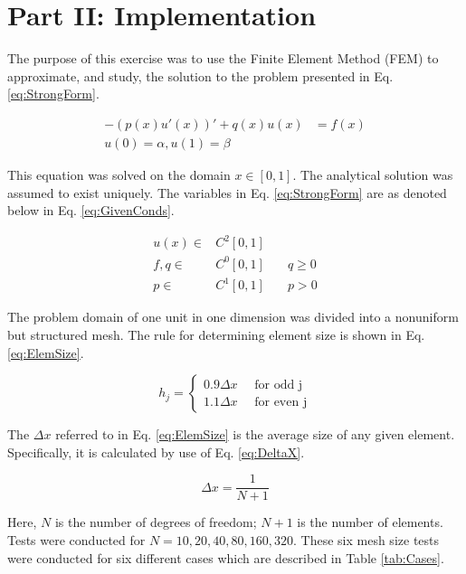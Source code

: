 \documentclass[a4paper, 12pt]{article}
\title{}
\begin{document}

\section*{Part II: Implementation} \label{sec:intro}
The purpose of this exercise was to use the Finite Element Method (FEM) 
to approximate, and study, the solution to the problem presented in 
Eq. \ref{eq:StrongForm}.

\begin{align}
-(p(x)u'(x))' + q(x) u(x) &= f(x)  \label{eq:StrongForm} \\
u(0) = \alpha , u(1) = \beta  &
\end{align}

\noindent
This equation was solved on the domain $x\in[0,1]$. 
The analytical solution was assumed to exist uniquely.
The variables in Eq. \ref{eq:StrongForm} are as denoted below in Eq. \ref{eq:GivenConds}.

\begin{align} \label{eq:GivenConds}
u(x)\in & C^2 [0,1]  & \\
f,q \in & C^0 [0,1] \quad & q \geq 0\\
p   \in & C^1 [0,1] \quad &p > 0
\end{align}

\noindent
The problem domain of one unit in one dimension was divided into a nonuniform but structured mesh.
The rule for determining element size is shown in Eq. \ref{eq:ElemSize}.

\[
  h_{j} = \begin{cases} 
    0.9 \Delta x \quad \text{ for odd j}  \label{eq:ElemSize} \\
    1.1 \Delta x \quad \text{ for even j}
  \end{cases}
\]

\noindent
The $\Delta x$ referred to in Eq. \ref{eq:ElemSize} is the average size of any given element. 
Specifically, it is calculated by use of Eq. \ref{eq:DeltaX}.

\begin{equation} \label{eq:DeltaX}
\Delta x = \frac{1}{N+1}
\end{equation}

\noindent
Here, $N$ is the number of degrees of freedom; $N+1$ is the number of elements.
Tests were conducted for $N=10, 20, 40, 80, 160, 320$. 
These six mesh size tests were conducted for six different cases which are described in 
Table \ref{tab:Cases}.
\end{document}
